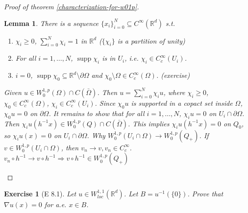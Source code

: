 \documentclass{report}
\theoremstyle{tommy}
\newtheorem{lem}[defn]{Lemma}
\newtheorem{ex}[defn]{Exercise}
\newcommand{\supp}{\operatorname{supp}}
\begin{document}
\begin{proof}[Proof of theorem \ref{characterization-for-w01p}]
\begin{itemize}
      \begin{lem}
        There is a sequence \(\{x_i\}_{i=0}^N \subseteq C^\infty(\mathbb{R}^d)\) s.t.
        \begin{enumerate}
          \item \(\chi_i \ge 0\), \(\sum_{i=0}^N \chi_i = 1\) in \(\mathbb{R}^d\) (\(\{\chi_i\}\) is a partition of unity)
          \item For all \(i=1, \dots, N\), \(\supp \chi_i\) is in \(U_i\), i.e. \(\chi_i \in C_c^\infty(U_i)\).
          \item \(i=0\), \(\supp \chi_0 \subseteq \mathbb{R}^d \setminus \partial \Omega\) and \(\chi_0 \setminus \Omega \in C_c^\infty(\Omega)\). (exercise)
        \end{enumerate}
        Given \(u \in W_0^{1,p}(\Omega) \cap C(\bar \Omega)\). Then \(u = \sum_{i=0}^N \chi_i u\), where \(\chi_i \ge 0\), \(\chi_0 \in C_c^\infty(\Omega)\), \(\chi_i \in C_c^\infty(U_i)\). Since \(\chi_0 u\) is supported in a copact set inside \(\Omega\), \(\chi_0 u = 0\) on \(\partial \Omega\). It remains to show that for all \(i=1, \dots, N\), \(\chi_i u = 0\) on \(U_i \cap \partial \Omega\). Then \(\chi_i u(h^{-1}x) \in W_0^{1,p}(Q) \cap C(\bar \Omega)\). This implies \(\chi_i u (h^{-1}x) = 0\) on \(Q_0\), so \(\chi_i u(x) = 0\) on \(U_i \cap \partial \Omega\). 
        Why \(W_0^{1,p}(U_i \cap \Omega) \to W_0^{1,p}(Q_+)\). If \(v \in W_0^{1,p}(U_i \cap \Omega)\), then \(v_n \to v, v_n \in C_c^\infty\). \(v_n \circ h^{-1} \to v \circ h^{-1} \Rightarrow v \circ h^{-1} \in W_0^{1,p}(Q_+)\)
      \end{lem}
    \end{itemize}
  \end{proof}

  \begin{ex}[E 8.1]
    Let \(u \in W_{loc}^{1,1}(\mathbb{R}^d)\). Let \(B = u^{-1}(\{0\})\). Prove that \(\nabla u(x) = 0\) for a.e. \(x \in B\). 
  \end{ex}
\end{document}
